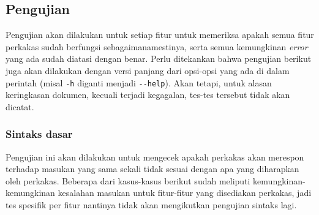 \subsection{Pengujian}
\label{sec:testing-experiments}

Pengujian akan dilakukan untuk setiap fitur untuk memeriksa apakah semua fitur perkakas sudah berfungsi sebagaimanamestinya, serta semua kemungkinan \textit{error} yang ada sudah diatasi dengan benar. Perlu ditekankan bahwa pengujian berikut juga akan dilakukan dengan versi panjang dari opsi-opsi yang ada di dalam perintah (misal \verb|-h| diganti menjadi \verb|--help|). Akan tetapi, untuk alasan keringkasan dokumen, kecuali terjadi kegagalan, tes-tes tersebut tidak akan dicatat.

\subsubsection{Sintaks dasar}
\label{sec:testing-experiments-basic}

Pengujian ini akan dilakukan untuk mengecek apakah perkakas akan merespon terhadap masukan yang sama sekali tidak sesuai dengan apa yang diharapkan oleh perkakas. Beberapa dari kasus-kasus berikut sudah meliputi kemungkinan-kemungkinan kesalahan masukan untuk fitur-fitur yang disediakan perkakas, jadi tes spesifik per fitur nantinya tidak akan mengikutkan pengujian sintaks lagi.

